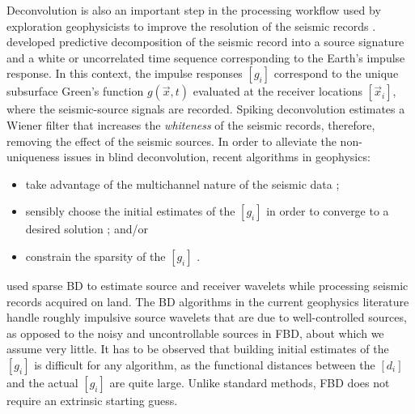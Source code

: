 \documentclass{article}
\theoremstyle{definition}
\def\vecc#1{[#1]}
\begin{document}
%
Deconvolution is 
also an
important step in the processing workflow 
used by exploration geophysicists
to improve
the resolution of the seismic records \citep{ulrych1995wavelet, liu2003survey, van2008robust}.
%
\cite{robinson1957predictive} developed predictive decomposition \citep{wold1938study}
of the seismic record into a source signature and a white or uncorrelated time sequence corresponding to the Earth's impulse response.
%
In this context, the impulse responses $\vecc{g_i}$ correspond 
to the 
unique subsurface Green's function {$g(\vec{x},t)$} 
evaluated at the receiver locations {$\vecc{\vec{x}_i}$}, 
where the seismic-source signals are recorded.
%
Spiking deconvolution \citep{robinson1980geophysical, yilmaz2001seismic} 
estimates a Wiener filter that
increases the \emph{whiteness} of the seismic records, therefore,
removing the effect of the seismic sources.
%
In order to alleviate the non-uniqueness issues in blind deconvolution,
recent algorithms 
in geophysics{:}
\begin{itemize}
\item take advantage of the multichannel nature of the seismic data \citep{kaaresen1998multichannel,kazemi2014sparse, nose2015fast, liu2016sparse};
\item sensibly choose the initial estimates of the %
$\vecc{g_i}$ in order to converge to a desired solution \citep{liu2016sparse}; {and/or}
\item constrain the sparsity of the %
$\vecc{g_i}$ \citep{kazemi2014sparse}.
\end{itemize}
%
\cite{kazemi2016surface} used sparse BD 
to estimate source and receiver wavelets while processing seismic records acquired on land.
%
The {BD} algorithms in the current geophysics literature
handle roughly impulsive source wavelets that are due to %
{well-controlled} sources, as opposed to the {noisy and uncontrollable sources} in FBD{,
about which we assume very little}.
%
It has to be observed that 
building initial estimates of the %
$\vecc{g_i}$ is difficult for {any algorithm,} 
as the {functional} distance{s} between the %
$\vecc{d_i}$ and the actual %
$\vecc{g_i}$ are quite large. {Unlike standard methods,}
FBD does not require an extrinsic starting guess. 
\end{document}
